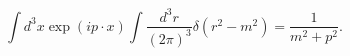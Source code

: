 \begin{equation}
\int d^{3}x\exp(ip\cdot x)\int\frac{d^{3}r}{(2\pi)^{3}}\delta(r^{2}%
-m^{2})=\frac{1}{m^{2}+p^{2}}.
\end{equation}

